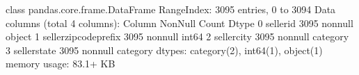 \documentclass[letterpaper,10pt,english]{jupyterBook}
\begin{document}
\begin{sphinxVerbatim}[commandchars=\\\{\}]
\PYG{p}{[}\PYG{p}{]}  \PYG{p}{[}\PYG{p}{]}
\PYG{p}{[}\PYG{p}{]}  \PYG{p}{[}\PYG{p}{]}
\end{sphinxVerbatim}

\begin{sphinxVerbatim}[commandchars=\\\{\}]
\PYGZlt{}class \PYGZsq{}pandas.core.frame.DataFrame\PYGZsq{}\PYGZgt{}
RangeIndex: 3095 entries, 0 to 3094
Data columns (total 4 columns):
 \PYGZsh{}   Column                  Non\PYGZhy{}Null Count  Dtype   
\PYGZhy{}\PYGZhy{}\PYGZhy{}  \PYGZhy{}\PYGZhy{}\PYGZhy{}\PYGZhy{}\PYGZhy{}\PYGZhy{}                  \PYGZhy{}\PYGZhy{}\PYGZhy{}\PYGZhy{}\PYGZhy{}\PYGZhy{}\PYGZhy{}\PYGZhy{}\PYGZhy{}\PYGZhy{}\PYGZhy{}\PYGZhy{}\PYGZhy{}\PYGZhy{}  \PYGZhy{}\PYGZhy{}\PYGZhy{}\PYGZhy{}\PYGZhy{}   
 0   seller\PYGZus{}id               3095 non\PYGZhy{}null   object  
 1   seller\PYGZus{}zip\PYGZus{}code\PYGZus{}prefix  3095 non\PYGZhy{}null   int64   
 2   seller\PYGZus{}city             3095 non\PYGZhy{}null   category
 3   seller\PYGZus{}state            3095 non\PYGZhy{}null   category
dtypes: category(2), int64(1), object(1)
memory usage: 83.1+ KB
\end{sphinxVerbatim}

\begin{sphinxVerbatim}[commandchars=\\\{\}]
\end{sphinxVerbatim}
\end{document}
